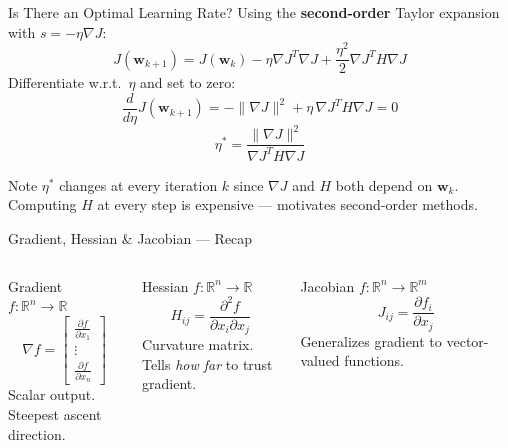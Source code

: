 \documentclass{beamer}
\begin{document}
\begin{frame}{Is There an Optimal Learning Rate?}
  Using the \textbf{second-order} Taylor expansion with $s = -\eta\nabla J$:
  \[
    J(\mathbf{w}_{k+1})
    = J(\mathbf{w}_k) - \eta\nabla J^T\nabla J + \frac{\eta^2}{2}\nabla J^T H\nabla J
  \]
  Differentiate w.r.t.\ $\eta$ and set to zero:
  \[
    \frac{d}{d\eta}J(\mathbf{w}_{k+1})
    = -\|\nabla J\|^2 + \eta\,\nabla J^T H\nabla J = 0
  \]
  \[
    \boxed{\eta^* = \frac{\|\nabla J\|^2}{\nabla J^T H\nabla J}}
  \]
  \begin{alertblock}{Note}
    $\eta^*$ changes at every iteration $k$ since $\nabla J$ and $H$ both depend on $\mathbf{w}_k$.
    Computing $H$ at every step is expensive --- motivates second-order methods.
  \end{alertblock}
\end{frame}

\begin{frame}{Gradient, Hessian \& Jacobian --- Recap}
  \begin{columns}
    \begin{block}{Gradient}
      $f:\mathbb{R}^n\to\mathbb{R}$
      \[
        \nabla f = \begin{bmatrix}\frac{\partial f}{\partial x_1}\\\vdots\\\frac{\partial f}{\partial x_n}\end{bmatrix}
      \]
      Scalar output.\\
      Steepest ascent direction.
    \end{block}
    \begin{block}{Hessian}
      $f:\mathbb{R}^n\to\mathbb{R}$
      \[
        H_{ij} = \frac{\partial^2 f}{\partial x_i \partial x_j}
      \]
      Curvature matrix.\\
      Tells \emph{how far} to trust gradient.
    \end{block}
    \begin{block}{Jacobian}
      $f:\mathbb{R}^n\to\mathbb{R}^m$
      \[
        J_{ij} = \frac{\partial f_i}{\partial x_j}
      \]
      Generalizes gradient to vector-valued functions.
    \end{block}
  \end{columns}
\end{frame}
\end{document}
